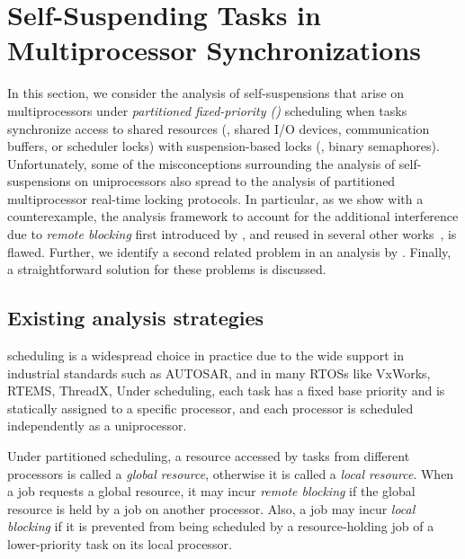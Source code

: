 \section{Self-Suspending Tasks in Multiprocessor Synchronizations}
\label{sec:syn}

In this section, we consider the analysis of self-suspensions that arise on multiprocessors under \emph{partitioned fixed-priority (\pfp)} scheduling when tasks synchronize access to shared resources (\eg, shared I/O devices, communication buffers, or scheduler locks) with suspension-based locks (\eg, binary semaphores). Unfortunately, some of the misconceptions surrounding the analysis of self-suspensions on uniprocessors also spread to the analysis of partitioned multiprocessor real-time locking protocols. In particular, as we show with a counterexample, the analysis framework to account for the additional interference due to \emph{remote blocking} first introduced by \citet{lakshmanan-2009}, and reused in several other works~\cite{zeng-2011,bbb-2013,yang-2013,kim-2014,han-2014,carminati-2014,yang-2014},  is flawed. Further, we identify a second related problem in an analysis by \citet{NBN:11}. Finally, a straightforward solution for these problems is discussed. 

\subsection{Existing analysis strategies}
\label{sec:papers}

\pfp scheduling is a widespread choice in practice due to the wide support in industrial standards such as AUTOSAR, and in many RTOSs like VxWorks, RTEMS, ThreadX, \etc Under \pfp scheduling, each task has a fixed base priority and is statically assigned to a specific processor, and each processor is scheduled independently as a uniprocessor.

\iffalse
At runtime, a resource-holding job may be assigned a temporarily elevated effective priority according to the employed locking protocol. Thus on each processor, the ready job with highest effective priority is scheduled.\todo{Why are effective priorities relevant here? Just cut it?} 
\fi

Under partitioned scheduling, a resource accessed by tasks from different processors is called a \emph{global resource}, otherwise it is called a \emph{local resource}. When a job requests a global resource, it may incur \emph{remote blocking} if the global resource is held by a job on another processor. Also, a job may incur \emph{local blocking} if it is prevented from being scheduled by a resource-holding job of a lower-priority task on its local processor. 

